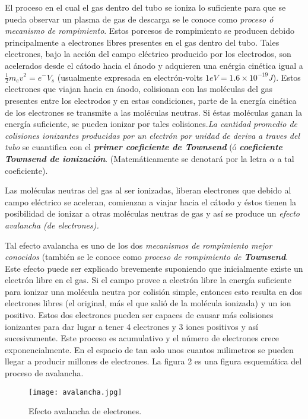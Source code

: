 \documentclass[letterpaper,12pt]{article}
\begin{document}
El proceso en el cual el gas dentro del tubo se ioniza lo suficiente para que se pueda observar un plasma de gas de descarga se le conoce como \textit{proceso ó mecanismo  de rompimiento}. Estos porcesos de rompimiento se producen debido principalmente a electrones libres presentes en el gas dentro del tubo. Tales electrones, bajo la acción del campo eléctrico producido por los electrodos, son acelerados desde el cátodo hacia el ánodo y adquieren una enérgia cinética igual a $\frac{1}{2}m_ev^2=e^- V_s$ (usualmente expresada en electrón-volts $1eV=1.6\times10^{-19}J$). Estos electrones que viajan hacia en ánodo, colisionan con las moléculas del gas presentes entre los electrodos y en estas condiciones, parte de la energía cinética de los electrones se transmite a las moléculas neutras.  Si éstas moléculas ganan la energía suficiente, se pueden ionizar por tales colisiones.\textit{La cantidad promedio de colisiones ionizantes producidas por un electrón por unidad de deriva a traves del tubo} se cuantifica con el \textbf{\textit{primer coeficiente de Townsend}} (ó \textbf{\textit{coeficiente Townsend de ionización}}. (Matemáticamente se denotará por la letra $\alpha$ a tal coeficiente). 

Las moléculas neutras del gas al ser ionizadas, liberan electrones que debido al campo eléctrico  se aceleran, comienzan a viajar hacia el cátodo  y éstos tienen la posibilidad de ionizar a otras moléculas neutras de gas y así se produce un \textit{efecto avalancha (de electrones).} 	
 
Tal efecto avalancha es uno de los dos \textit{mecanismos de rompimiento mejor conocidos} (también se le conoce como \textit{proceso de rompimiento de \textbf{Townsend}}. Este efecto puede ser explicado brevemente suponiendo que inicialmente existe un electrón libre en el gas. Si el campo provee a electrón libre la energía suficiente para ionizar una molécula neutra por colisión simple, entonces  esto resulta en dos electrones libres (el original, más el que salió de la molécula ionizada) y un ion positivo. Estos dos electrones pueden ser capaces de causar más colisiones ionizantes para dar lugar a tener 4 electrones y 3 iones positivos y así sucesivamente. Este proceso es acumulativo y el número de electrones crece exponencialmente. En el espacio de tan solo unos cuantos milimetros se pueden llegar a producir millones de electrones. La figura 2 es una figura esquemática del proceso de avalancha.

\begin{figure}[!h]
\centering
\texttt{[image: avalancha.jpg]}
\caption{Efecto avalancha de electrones.}
\end{figure}
\end{document}
